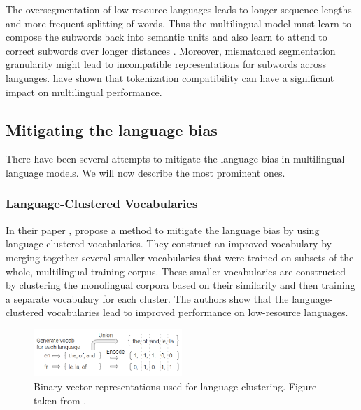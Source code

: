 The oversegmentation of low-resource languages leads to longer sequence lengths and more frequent splitting of words. Thus the multilingual model must learn to compose the subwords back into semantic units and also learn to attend to correct subwords over longer distances \cite{chung_improving_2020}. Moreover, mismatched segmentation granularity might lead to incompatible representations for subwords across languages. \citet{maronikolakis_wine_2021} have shown that tokenization compatibility can have a significant impact on multilingual performance.

\subsection{Mitigating the language bias}

There have been several attempts to mitigate the language bias in multilingual language models. We will now describe the most prominent ones.

\subsubsection{Language-Clustered Vocabularies}

In their paper  \cite{chung_improving_2020}, \citeauthor{chung_improving_2020} propose a method to mitigate the language bias by using language-clustered vocabularies. They construct an improved vocabulary by merging together several smaller vocabularies that were trained on subsets of the whole, multilingual training corpus. These smaller vocabularies are constructed by clustering the monolingual corpora based on their similarity and then training a separate vocabulary for each cluster. The authors show that the language-clustered vocabularies lead to improved performance on low-resource languages.


\begin{figure}[ht]
    \centering
    \includegraphics[width=0.5\textwidth]{img/temp/chung_language_vectors.png}
    \caption{Binary vector representations used for language clustering. Figure taken from \cite{chung_improving_2020}.}
    \label{fig:chung_vectors}
\end{figure}


